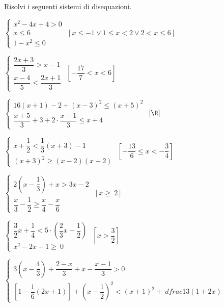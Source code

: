 \begin{esercizio}[\Ast]
 \label{ese:21.41}
 Risolvi i seguenti sistemi di disequazioni.
 \begin{enumeratea}
\item \(\left\{\begin{array}{l}x^2-4x+4>0\\x\le 6\\1-x^2\le 
0\end{array}\right.\)
 \hfill \(\left[x\le -1\vee 1\le x<2\vee 2<x\le 6\right]\)
\item {\longarray \(\left\{\begin{array}{l}
\dfrac{2x+3}{3}>x-1\\
\dfrac{x-4}{5}<\dfrac{2x+1}{3}
\end{array}\right.\)}
 \hfill \(\left[-{\dfrac{17}{7}}<x<6\right]\)
\item {\longarray \(\left\{\begin{array}{l}
16(x+1)-2+(x-3)^{2}\le(x+5)^{2}\\
\dfrac{x+5}{3}+3+2\cdot\dfrac{x-1}{3}\le x+4
\end{array}\right.\)}
 \hfill \(\left[\R\right]\)
\item \(\left\{\begin{array}{l}
x+\dfrac{1}{2}<\dfrac{1}{3}(x+3)-1\\
(x+3)^{2}\ge (x-2)(x+2)
\end{array}\right.\)
 \hfill \(\left[-{\dfrac{13}{6}}\le x<-{\dfrac{3}{4}}\right]\)
\item {\longarray \(\left\{\begin{array}{l}
2\left(x-\dfrac{1}{3}\right)+x>3x-2\\
\dfrac{x}{3}-\dfrac{1}{2}\ge \dfrac{x}{4}-\dfrac{x}{6}
  \end{array}\right.\)}
 \hfill \(\left[x\ge~2\right]\)
\item \(\left\{\begin{array}{l}
  \dfrac{3}{2}x+\dfrac{1}{4}<5\cdot\left(\dfrac{2}{3}x-\dfrac{1}{2}\right)\\
  x^2-2x+1\ge~0
\end{array}\right.\)
 \hfill \(\left[x>\dfrac{3}{2}\right]\)
\item {\longarray \(\left\{\begin{array}{l}
3\left(x-\dfrac{4}{3}\right)+\dfrac{2-x}{3}+x-\dfrac{x-1}{3}>0\\
\left[1-\dfrac{1}{6}(2x+1)\right]+\left(x-\dfrac{1}{2}\right)^{2}<(x+1)^{2}+\
dfrac{1}{3}(1+2x)
   \end{array}\right.\)}

\end{enumeratea}
\end{esercizio}

